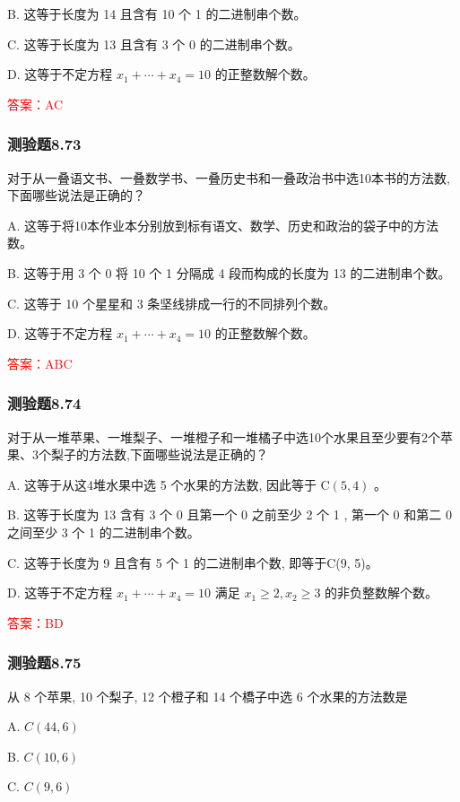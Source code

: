 \documentclass[UTF8, heading=true]{ctexart}
\begin{document}
B. 这等于长度为 14 且含有 10 个 1 的二进制串个数。

C. 这等于长度为 13 且含有 3 个 0 的二进制串个数。

D. 这等于不定方程 $x_1+\cdots+x_4=10$ 的正整数解个数。

\textcolor{red}{答案：AC}

\subsubsection{测验题8.73}

对于从一叠语文书、一叠数学书、一叠历史书和一叠政治书中选10本书的方法数,下面哪些说法是正确的？

A. 这等于将10本作业本分别放到标有语文、数学、历史和政治的袋子中的方法数。

B. 这等于用 3 个 0 将 10 个 1 分隔成 4 段而构成的长度为 13 的二进制串个数。

C. 这等于 10 个星星和 3 条坚线排成一行的不同排列个数。

D. 这等于不定方程 $x_1+\cdots+x_4=10$ 的正整数解个数。

\textcolor{red}{答案：ABC}

\subsubsection{测验题8.74}

对于从一堆苹果、一堆梨子、一堆橙子和一堆橘子中选10个水果且至少要有2个苹果、3个梨子的方法数,下面哪些说法是正确的？

A. 这等于从这4堆水果中选 5 个水果的方法数, 因此等于 $\mathrm{C}(5,4)$ 。

B. 这等于长度为 13 含有 3 个 0 且第一个 0 之前至少 2 个 1 , 第一个 0 和第二 0 之间至少 3 个 1 的二进制串个数。

C. 这等于长度为 9 且含有 5 个 1 的二进制串个数, 即等于C(9, 5)。

D. 这等于不定方程 $x_1+\cdots+x_4=10$ 满足 $x_1 \geq 2, x_2 \geq 3$ 的非负整数解个数。

\textcolor{red}{答案：BD}

\subsubsection{测验题8.75}

从 8 个苹果, 10 个梨子, 12 个橙子和 14 个橋子中选 6 个水果的方法数是

A. $ C(44,6)$

B. $ C(10,6)$

C. $ C(9,6)$
\end{document}
